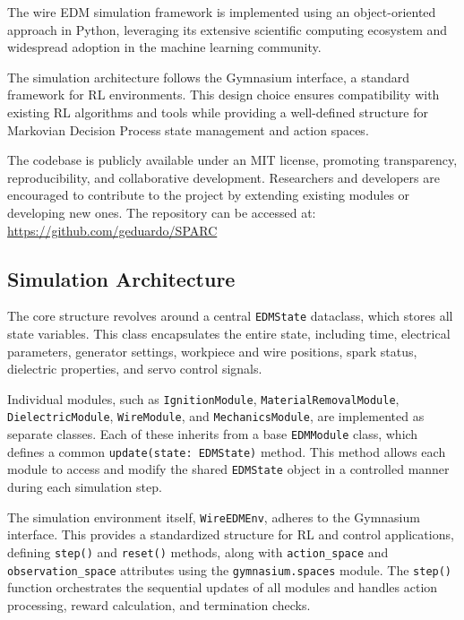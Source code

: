\documentclass[5p,times,procedia]{elsarticle}
\begin{document}
The wire EDM simulation framework is implemented using an object-oriented approach in Python, leveraging its extensive scientific computing ecosystem and widespread adoption in the machine learning community.

The simulation architecture follows the Gymnasium \cite{towers2024gymnasium} interface, a standard framework for RL environments. This design choice ensures compatibility with existing RL algorithms and tools while providing a well-defined structure for Markovian Decision Process state management and action spaces.

The codebase is publicly available under an MIT license, promoting transparency, reproducibility, and collaborative development. Researchers and developers are encouraged to contribute to the project by extending existing modules or developing new ones. The repository can be accessed at: \url{https://github.com/geduardo/SPARC}


\subsection{Simulation Architecture}

The core structure revolves around a central \texttt{EDMState} dataclass, which stores all state variables. This class encapsulates the entire state, including time, electrical parameters, generator settings, workpiece and wire positions, spark status, dielectric properties, and servo control signals.

Individual modules, such as \texttt{IgnitionModule}, \texttt{MaterialRemovalModule}, \texttt{DielectricModule}, \texttt{WireModule}, and \texttt{MechanicsModule}, are implemented as separate classes. Each of these inherits from a base \texttt{EDMModule} class, which defines a common \texttt{update(state: EDMState)} method. This method allows each module to access and modify the shared \texttt{EDMState} object in a controlled manner during each simulation step. 

The simulation environment itself, \texttt{WireEDMEnv}, adheres to the Gymnasium interface. This provides a standardized structure for RL and control applications, defining \texttt{step()} and \texttt{reset()} methods, along with \texttt{action\_space} and \texttt{observation\_space} attributes using the \texttt{gymnasium.spaces} module. The \texttt{step()} function orchestrates the sequential updates of all modules and handles action processing, reward calculation, and termination checks.
\end{document}
